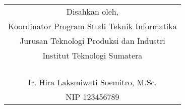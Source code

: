 \begin{center}
	\centering 
	\begin{tabular}{c}
		Disahkan oleh,\\
		Koordinator Program Studi Teknik Informatika\\
		Jurusan Teknologi Produksi dan Industri\\
		Institut Teknologi Sumatera
		\\
		\\
		\\
		\\
		\\
		Ir. Hira Laksmiwati Soemitro, M.Sc. \\ %
		NIP 123456789 \\
	\end{tabular}
	
\end{center}
\clearpage
